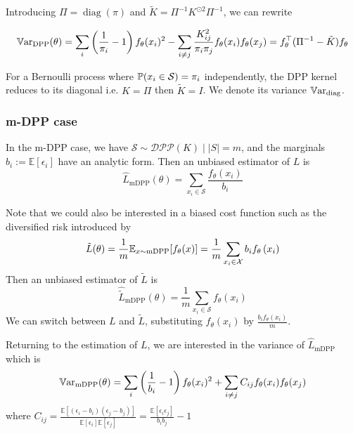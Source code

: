 Introducing $\Pi = \operatorname{diag}(\pi)$ and $\tilde K = \Pi^{-1}K^{\odot 2} \Pi^{-1}$, we can rewrite  

\begin{equation}
	\operatorname{\mathbb V ar}_{\textrm{DPP}}(\theta)=\sum_{i}\left(\frac{1}{\pi_{i}}-1\right) f_\theta(x_{i})^{2}-\sum_{i \neq j} \frac{K_{ij}^{2}}{\pi_{i} \pi_{j}} f_\theta(x_{i}) f_\theta(x_{j}) =  f_\theta^\top (\Pi^{-1}  - \tilde{K}) f_\theta 
\end{equation}

For a Bernoulli process where $\mathbb{P}(x_i \in \mathcal S) = \pi_i$ independently, the DPP kernel reduces to its diagonal i.e. $K = \Pi$ then $\tilde K = I$. We denote its variance $\operatorname{\mathbb V ar}_{\textrm{diag}}$.


\subsubsection{m-DPP case}

In the m-DPP case, we have $\mathcal S \sim \mathcal{DPP}(K) \mid |S|=m$, and the marginals $b_{i} := \mathbb{E}\left[\epsilon_{i}\right]$ have an analytic form. Then an unbiased estimator of $L$ is
\begin{equation*}
	\hat L_{\textrm{mDPP}}(\theta) = \sum_{x_i\in \mathcal S} \frac{f_\theta(x_i)}{b_i}
\end{equation*}

Note that we could also be interested in a biased cost function such as the diversified risk introduced by \cite{zhang2017dppminibatch}
$$
\tilde L(\theta) =\frac{1}{m}\mathbb{E}_{x \sim \textrm{mDPP}}[f_\theta(x)]=\frac{1}{m}\sum_{x_i \in \mathcal X} b_{i} f_\theta\left(x_{i}\right)
$$
Then an unbiased estimator of $\tilde L$ is
\begin{equation*}
	\hat{\tilde L}_{\textrm{mDPP}}(\theta) = \frac{1}{m}\sum_{x_i\in \mathcal S} f_\theta(x_i)
\end{equation*}
We can switch between $L$ and $\tilde L$, substituting $f_\theta(x_i)$ by $\frac{b_i f_\theta(x_i)}{m}$.

Returning to the estimation of $L$, we are interested in the variance of $\hat L_{\textrm{mDPP}}$ which is
\begin{equation}
	\operatorname{\mathbb V ar}_{\textrm{mDPP}}(\theta)=\sum_{i}\left(\frac{1}{b_i}-1\right) f_\theta(x_i)^2
	+ \sum_{i \neq j} C_{ij}f_\theta(x_i) f_\theta(x_j)
\end{equation}
where $C_{ij}=\frac{\mathbb{E}\left[\left(\epsilon_{i}-b_{i}\right)\left(\epsilon_{j}-b_{j}\right)\right]}{\mathbb{E}\left[\epsilon_{i}\right] \mathbb{E}\left[\epsilon_{j}\right]}=\frac{\mathbb{E}\left[\epsilon_{i} \epsilon_{j}\right]}{b_{i} b_{j}}-1
$

